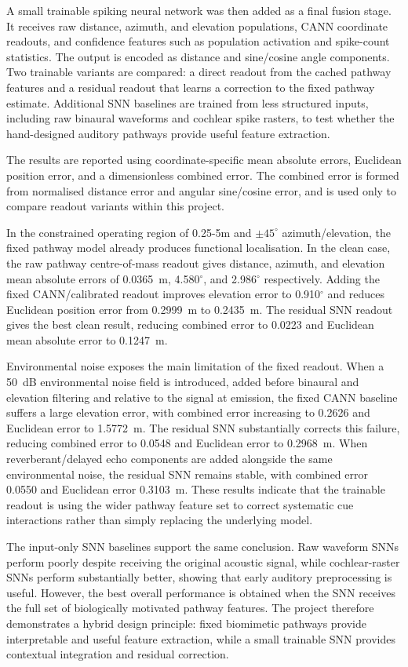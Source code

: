 A small trainable spiking neural network was then added as a final fusion stage. It receives raw distance, azimuth, and elevation populations, CANN coordinate readouts, and confidence features such as population activation and spike-count statistics. The output is encoded as distance and sine/cosine angle components. Two trainable variants are compared: a direct readout from the cached pathway features and a residual readout that learns a correction to the fixed pathway estimate. Additional SNN baselines are trained from less structured inputs, including raw binaural waveforms and cochlear spike rasters, to test whether the hand-designed auditory pathways provide useful feature extraction.

The results are reported using coordinate-specific mean absolute errors, Euclidean position error, and a dimensionless combined error. The combined error is formed from normalised distance error and angular sine/cosine error, and is used only to compare readout variants within this project.

In the constrained operating region of 0.25-5m and $\pm45^\circ$ azimuth/elevation, the fixed pathway model already produces functional localisation. In the clean case, the raw pathway centre-of-mass readout gives distance, azimuth, and elevation mean absolute errors of 0.0365~m, 4.580$^\circ$, and 2.986$^\circ$ respectively. Adding the fixed CANN/calibrated readout improves elevation error to 0.910$^\circ$ and reduces Euclidean position error from 0.2999~m to 0.2435~m. The residual SNN readout gives the best clean result, reducing combined error to 0.0223 and Euclidean mean absolute error to 0.1247~m.

Environmental noise exposes the main limitation of the fixed readout. When a 50~dB environmental noise field is introduced, added before binaural and elevation filtering and relative to the signal at emission, the fixed CANN baseline suffers a large elevation error, with combined error increasing to 0.2626 and Euclidean error to 1.5772~m. The residual SNN substantially corrects this failure, reducing combined error to 0.0548 and Euclidean error to 0.2968~m. When reverberant/delayed echo components are added alongside the same environmental noise, the residual SNN remains stable, with combined error 0.0550 and Euclidean error 0.3103~m. These results indicate that the trainable readout is using the wider pathway feature set to correct systematic cue interactions rather than simply replacing the underlying model.

The input-only SNN baselines support the same conclusion. Raw waveform SNNs perform poorly despite receiving the original acoustic signal, while cochlear-raster SNNs perform substantially better, showing that early auditory preprocessing is useful. However, the best overall performance is obtained when the SNN receives the full set of biologically motivated pathway features. The project therefore demonstrates a hybrid design principle: fixed biomimetic pathways provide interpretable and useful feature extraction, while a small trainable SNN provides contextual integration and residual correction.

